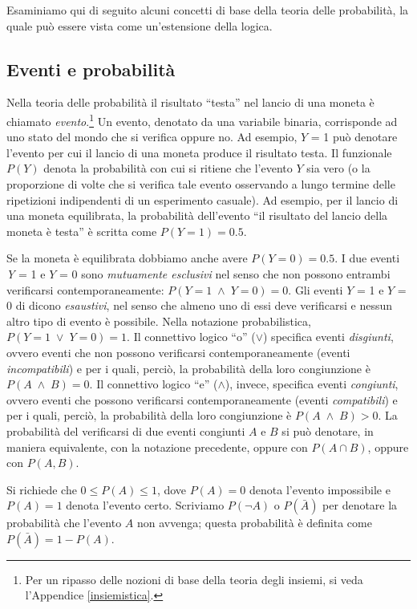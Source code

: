 \documentclass[
  11pt,
]{krantz}
\theoremstyle{definition}
\theoremstyle{definition}
\theoremstyle{definition}
\theoremstyle{definition}
\theoremstyle{remark}
\begin{document}
Esaminiamo qui di seguito alcuni concetti di base della teoria delle probabilità, la quale può essere vista come un'estensione della logica.

\hypertarget{eventi-e-probabilituxe0}{%
\subsection{Eventi e probabilità}\label{eventi-e-probabilituxe0}}

Nella teoria delle probabilità il risultato ``testa'' nel lancio di una moneta è chiamato \emph{evento}.\footnote{Per un ripasso delle nozioni di base della teoria degli insiemi, si veda l'Appendice \ref{insiemistica}.} Un evento, denotato da una variabile binaria, corrisponde ad uno stato del mondo che si verifica oppure no. Ad esempio, \(Y\) = 1 può denotare l'evento per cui il lancio di una moneta produce il risultato testa. Il funzionale \(P(Y)\) denota la probabilità con cui si ritiene che l'evento \(Y\) sia vero (o la proporzione di volte che si verifica tale evento osservando a lungo termine delle ripetizioni indipendenti di un esperimento casuale). Ad esempio, per il lancio di una moneta equilibrata, la probabilità dell'evento ``il risultato del lancio della moneta è testa'' è scritta come \(P(Y = 1) = 0.5.\)

Se la moneta è equilibrata dobbiamo anche avere \(P(Y = 0) = 0.5\). I due eventi \emph{Y} = 1 e \(Y\) = 0 sono \emph{mutuamente esclusivi} nel senso che non possono entrambi verificarsi contemporaneamente: \(P(Y = 1\; \land \; Y = 0) = 0.\) Gli eventi \(Y\) = 1 e \(Y\) = 0 di dicono \emph{esaustivi}, nel senso che almeno uno di essi deve verificarsi e nessun altro tipo di evento è possibile. Nella notazione probabilistica, \(P(Y = 1\; \lor \; Y = 0) = 1.\) Il connettivo logico ``o'' (\(\lor\)) specifica eventi \emph{disgiunti}, ovvero eventi che non possono verificarsi contemporaneamente (eventi \emph{incompatibili}) e per i quali, perciò, la probabilità della loro congiunzione è \(P(A \; \land \; B) = 0\). Il connettivo logico ``e'' (\(\land\)), invece, specifica eventi \emph{congiunti}, ovvero eventi che possono verificarsi contemporaneamente (eventi \emph{compatibili}) e per i quali, perciò, la probabilità della loro congiunzione è \(P(A \; \land \; B) > 0\). La probabilità del verificarsi di due eventi congiunti \(A\) e \(B\) si può denotare, in maniera equivalente, con la notazione precedente, oppure con \(P(A \cap B)\), oppure con \(P(A, B)\).

Si richiede che \(0 \leq P(A) \leq 1\), dove \(P(A) = 0\) denota l'evento impossibile e \(P(A) = 1\) denota l'evento certo. Scriviamo \(P(\lnot A)\) o \(P(\bar{A})\) per denotare la probabilità che l'evento \(A\) non avvenga; questa probabilità è definita come \(P(\bar{A}) = 1 − P(A)\).
\end{document}
